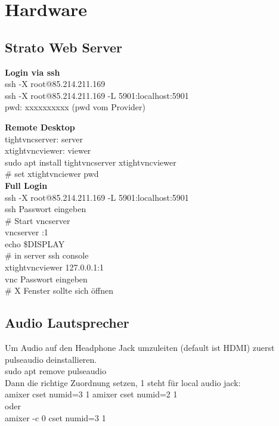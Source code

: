 \newpage
\section{Hardware}

\subsection{Strato Web Server}
\textbf{Login via ssh}\\
ssh -X root@85.214.211.169\\
ssh -X root@85.214.211.169 -L 5901:localhost:5901\\
pwd: xxxxxxxxxx (pwd vom Provider)

\textbf{Remote Desktop}\\
tightvncserver: server\\
xtightvncviewer: viewer\\
sudo apt install tightvncserver xtightvncviewer\\
\# set xtightvnciewer pwd\\

\textbf{Full Login}\\
ssh -X root@85.214.211.169 -L 5901:localhost:5901\\
ssh Passwort eingeben\\
\# Start vncserver\\
vncserver :1\\
echo \grqq{}\$DISPLAY\grqq{}\\
\# in server ssh console\\
xtightvncviewer 127.0.0.1:1\\
vnc Passwort eingeben\\
\# X Fenster sollte sich öffnen

\subsection{Audio Lautsprecher}
Um Audio auf den Headphone Jack umzuleiten (default ist HDMI) zuerst pulseaudio deinstallieren.\\
sudo apt remove pulseaudio\\

Dann die richtige Zuordnung setzen, 1 steht für local audio jack:\\
amixer cset numid=3 1
amixer cset numid=2 1\\
oder \\
amixer -c 0 cset numid=3 1\\

